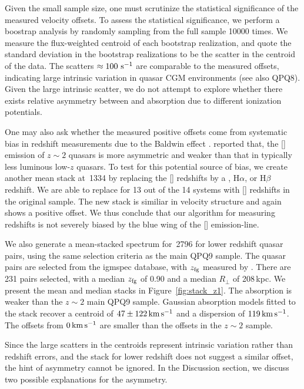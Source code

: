 \documentclass[iop]{emulateapj}
\begin{document}
Given the small sample size, one must scrutinize the statistical significance of the measured 
velocity offsets. To assess the statistical significance, we perform a boostrap analysis by 
randomly sampling from the full sample 10000 times. We measure the flux-weighted centroid of each 
bootstrap realization, and quote the standard deviation in the bootstrap realizations to be the 
scatter in the centroid of the data. The scatters $\approx100\,{\rm \,s^{-1}}$ are comparable 
to the measured offsets, indicating large intrinsic variation in quasar CGM environments (see 
also QPQ8). Given the large intrinsic scatter, we do not attempt to explore whether there exists 
relative asymmetry between  and  absorption due to different ionization 
potentials. 

One may also ask whether the measured positive offsets come from systematic bias in redshift 
measurements due to the Baldwin effect \citep{Baldwin77}. \cite{Shen16} reported that, the 
[] emission of $z\sim2$ quasars is more asymmetric and weaker than that in typically 
less luminous low-$z$ quasars. To test for this potential source of bias, we create another mean 
stack at \,1334 by replacing the [] redshifts by a , H$\alpha$, or 
H$\beta$ redshift. We are able to replace for 13 out of the 14 systems with [] redshifts 
in the original sample. The new stack is similiar in velocity structure and again shows a positive 
offset. We thus conclude that our algorithm for measuring redshifts is not severely biased by 
the blue wing of the [] emission-line. 

We also generate a mean-stacked spectrum for \,2796 for lower redshift quasar pairs, 
using the same selection criteria as the main QPQ9 sample. The quasar pairs are selected from the 
igmspec database, with $z_{\rm fg}$ measured by \cite{HewettWild10}. There are 231 pairs selected, 
with a median $z_{\rm fg}$ of 0.90 and a median $R_\perp$ of 208\,kpc. We present the mean and 
median stacks in Figure~\ref{fig:stack_z1}. The absorption is weaker than the $z\sim2$ main QPQ9 
sample. Gaussian absorption models fitted to the stack recover a centroid of 
$47\pm122\,{\rm km\,s^{-1}}$ and a dispersion of $119\,{\rm km\,s^{-1}}$. The offsets from 
$0\,{\rm km\,s^{-1}}$ are smaller than the offsets in the $z\sim2$ sample. 

Since the large scatters in the centroids represent intrinsic variation rather than redshift 
errors, and the  stack for lower redshift does not suggest a similar offset, the hint 
of asymmetry cannot be ignored. In the Discussion section, we discuss two possible explanations 
for the asymmetry. 
\end{document}
